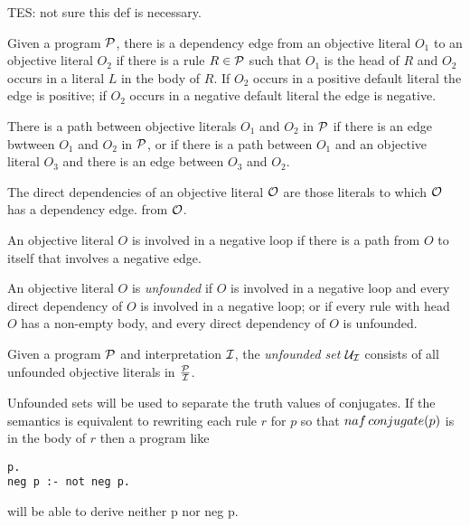 TES: not sure this def is necessary.

\begin{definition}
Given a program $\cP$, there is a dependency edge from an objective
literal $O_1$ to an objective literal $O_2$ if there is a rule $R \in
\cP$ such that $O_1$ is the head of $R$ and $O_2$ occurs in a literal
$L$ in the body of $R$.  If $O_2$ occurs in a positive default literal
the edge is positive; if $O_2$ occurs in a negative default literal
the edge is negative.

There is a path between objective literals $O_1$ and $O_2$ in $\cP$ if
there is an edge bwtween $O_1$ and $O_2$ in $\cP$, or if there is a
path between $O_1$ and an objective literal $O_3$ and there is an edge
between $O_3$ and $O_2$.

The direct dependencies of an objective literal $\cO$ are those
literals to which $\cO$ has a dependency edge.  
from $\cO$.

An objective literal $O$ is involved in a negative loop if there is a
path from $O$ to itself that involves a negative edge.

An objective literal $O$ is {\em unfounded} if $O$ is involved in a
negative loop and every direct dependency of $O$ is involved in a
negative loop; or if every rule with head $O$ has a non-empty body,
and every direct dependency of $O$ is unfounded.

Given a program $\cP$ and interpretation $\cI$, the {\em unfounded
  set} $\cU_{\cI}$ consists of all unfounded objective literals in
$\frac{\cP}{\cI}$.

\end{definition}

Unfounded sets will be used to separate the truth values of
conjugates.  If the semantics is equivalent to rewriting each rule $r$
for $p$ so that ${naf}\, conjugate(p)$ is in the body of $r$ then a
program like

\begin{verbatim} 
p.
neg p :- not neg p.
\end{verbatim}

\noindent
will be able to derive neither p nor neg p.


